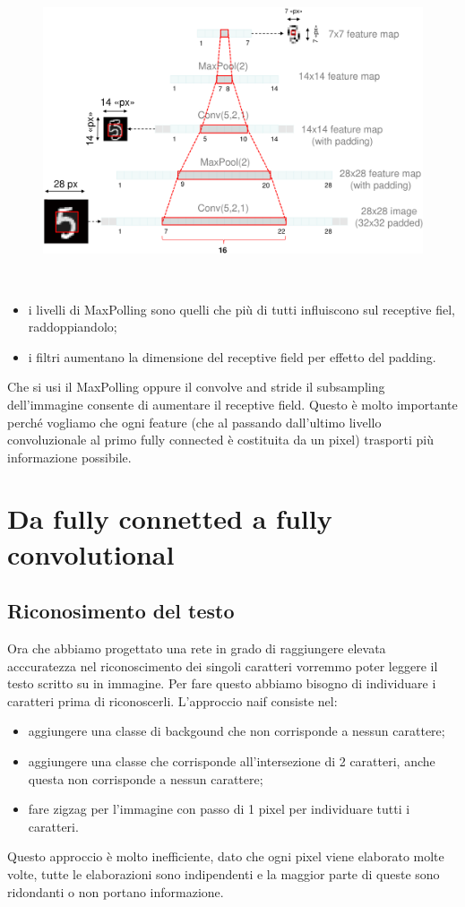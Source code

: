 \begin{figure}
	\vspace{-.5cm}
	\centering
	\includegraphics[width=\linewidth]{Picture/Receptive_Field}
\end{figure}
\ 
\vspace{-.5cm}
\begin{itemize}
	\item i livelli di MaxPolling sono quelli che più di tutti influiscono sul receptive fiel, raddoppiandolo;
	\item i filtri aumentano la dimensione del receptive field per effetto del padding.
\end{itemize}

	Che si usi il MaxPolling oppure il convolve and stride il subsampling dell'immagine consente di aumentare il receptive field. Questo è molto importante perché vogliamo che ogni feature (che al passando dall'ultimo livello convoluzionale al primo fully connected è costituita da un pixel) trasporti più informazione possibile.
	
\section{Da fully connetted a fully convolutional}
\subsection{Riconosimento del testo}
Ora che abbiamo progettato una rete in grado di raggiungere elevata acccuratezza nel riconoscimento dei singoli caratteri vorremmo poter leggere il testo scritto su in immagine. Per fare questo abbiamo bisogno di individuare i caratteri prima di riconoscerli. L'approccio naif consiste nel:
\begin{itemize}
	\item aggiungere una classe di backgound che non corrisponde a nessun carattere;
	\item aggiungere una classe che corrisponde all'intersezione di 2 caratteri, anche questa non corrisponde a nessun carattere;
	\item fare zigzag per l'immagine con passo di 1 pixel per individuare tutti i caratteri.
\end{itemize}
Questo approccio è molto inefficiente, dato che ogni pixel viene elaborato molte volte, tutte le elaborazioni sono indipendenti e la maggior parte di queste sono ridondanti o non portano informazione.
